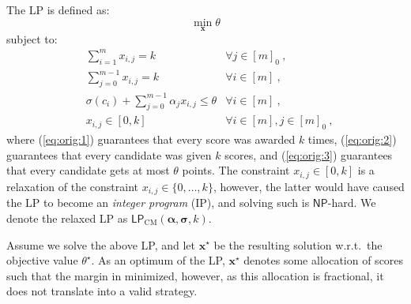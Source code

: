 \documentclass[letterpaper]{article} %
\newtheorem{lemma}[theorem]{Lemma}
\theoremstyle{definition}
\newcommand\vecc{\mathbf}
\newcommand\vecgreek{\bm}
\newcommand{\veca}{\vecgreek{\alpha}}
\newcommand{\vecs}{\vecgreek{\sigma}}
\newcommand{\NP}{\mathsf{NP}}
\newcommand{\LPCM}{\mathsf{LP}_{\mathrm{CM}}}
\newcommand{\EE}{\mathbb{E}}
\begin{document}
The LP is defined as:
\begin{equation}
\min_{\vecc{x}} \theta
\end{equation}
subject to:
\begin{align}
&\sum_{i=1}^m x_{i,j}=k &\forall j\in[m]_0\label{eq:orig:1}\ ,\\
&\sum_{j=0}^{m-1}x_{i,j}=k &\forall i\in[m]\label{eq:orig:2}\ ,\\
&\sigma(c_i)+ \sum_{j=0}^{m-1}\alpha_j x_{i,j}\leq \theta &\forall i\in[m]\label{eq:orig:3}\ ,\\
&x_{i,j} \in [0,k] & \forall i\in[m],j\in[m]_0\label{eq:to_rel}\ ,
\end{align}
where (\ref{eq:orig:1}) guarantees that every score was awarded $k$ times, (\ref{eq:orig:2}) guarantees that every candidate was given $k$ scores, and (\ref{eq:orig:3}) guarantees that  every candidate gets at most $\theta$ points. The constraint $x_{i,j} \in [0,k]$ is a relaxation of the constraint $x_{i,j} \in \{0,\ldots,k\}$, however, the latter would have  caused the LP to become an \emph{integer program} (IP), and solving such is $\NP$-hard.  We denote the relaxed LP as $\LPCM(\veca, \vecs, k)$.


Assume we solve the above LP, and let $\vecc{x^\star}$ be the resulting solution w.r.t.\ the objective value $\theta^\star$. As an optimum of the LP, $\vecc{x^\star}$ denotes some allocation of scores such that the margin in minimized, however, as this allocation is fractional, it does not translate into a valid strategy.
\end{document}
